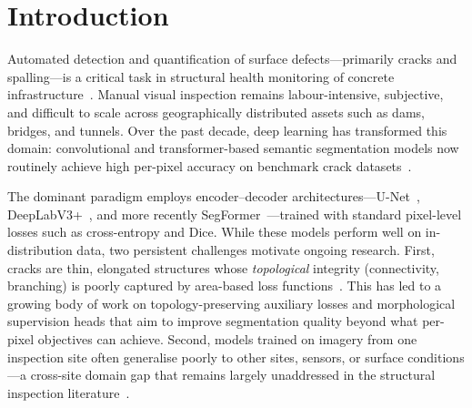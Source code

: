 
\section{Introduction}
\label{sec:introduction}

Automated detection and quantification of surface defects---primarily cracks and spalling---is a critical task in structural health monitoring of concrete infrastructure~\cite{koch2015review, mosalam2024dlshm}. Manual visual inspection remains labour-intensive, subjective, and difficult to scale across geographically distributed assets such as dams, bridges, and tunnels. Over the past decade, deep learning has transformed this domain: convolutional and transformer-based semantic segmentation models now routinely achieve high per-pixel accuracy on benchmark crack datasets~\cite{kulkarni2022crackseg9k, dorafshan2018sdnet, zhang2025crackreview}.

The dominant paradigm employs encoder--decoder architectures---U-Net~\cite{ronneberger2015unet}, DeepLabV3+~\cite{chen2018deeplabv3plus}, and more recently SegFormer~\cite{xie2021segformer}---trained with standard pixel-level losses such as cross-entropy and Dice. While these models perform well on in-distribution data, two persistent challenges motivate ongoing research. First, cracks are thin, elongated structures whose \emph{topological} integrity (connectivity, branching) is poorly captured by area-based loss functions~\cite{shit2021cldice, hu2019topology}. This has led to a growing body of work on topology-preserving auxiliary losses and morphological supervision heads that aim to improve segmentation quality beyond what per-pixel objectives can achieve. Second, models trained on imagery from one inspection site often generalise poorly to other sites, sensors, or surface conditions---a cross-site domain gap that remains largely unaddressed in the structural inspection literature~\cite{bukhsh2021damage, hassani2025dashm}.

